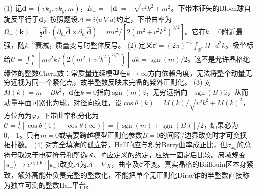 (1) 记\(\boldsymbol d=(vk_x,vk_y,m)\)，\(E_\pm=\pm|\boldsymbol d|=\pm\sqrt{v^2k^2+m^2}\)。下带本征矢的Bloch球自旋反平行于\(\boldsymbol d\)，按照题设\(\mathcal A=i\langle u|\nabla u\rangle\)约定，下带曲率为\(\Omega_-(\boldsymbol k)=\tfrac12\hat{\boldsymbol d}\cdot(\partial_{k_x}\hat{\boldsymbol d}\times\partial_{k_y}\hat{\boldsymbol d})=mv^2/[2(m^2+v^2k^2)^{3/2}]\)。它在\(k=0\)附近最强，随\(k^{-3}\)衰减，质量变号时整体反号。
(2) 定义\(\mathcal C=(2\pi)^{-1}\int_{\mathbb R^2}\Omega_-\,d^2k\)。极坐标给\(\mathcal C=\int_0^\infty [mv^2k/(2(m^2+v^2k^2)^{3/2})]\,dk=\operatorname{sgn}(m)/2\)。这不是允许晶格绝缘体的整数Chern数：常质量连续模型在\(k\to\infty\)方向依赖角度，无法将整个动量无穷远视为同一个紧化点，故半整数反映未完备的紫外正则化。
(3) 对\(M(k)=m-Bk^2\)，\(\hat{\boldsymbol d}\)在\(k=0\)指向\(\operatorname{sgn}(m)\hat z\)，无穷远指向\(-\operatorname{sgn}(B)\hat z\)，从而动量平面可紧化为球。对径向纹理，设\(\cos\theta(k)=M(k)/\sqrt{v^2k^2+M(k)^2}\)，方位角为\(\varphi\)，下带曲率积分化为\(\mathcal C=\frac12[\cos\theta(0)-\cos\theta(\infty)]=[\operatorname{sgn}(m)+\operatorname{sgn}(B)]/2\)，结果必为\(0,\pm1\)。只有\(m=0\)或需要跨越模型正则化参数\(B=0\)的间隙/边界改变时才可变换拓扑数。
(4) 对完全填满的孤立带，Hall响应与积分Berry曲率成正比，但\(\sigma_{xy}\)的总符号取决于电荷符号和所选\(\mathcal A\)、响应定义的约定，应统一固定后比较。局域规变\(|u_-\rangle\to e^{i\chi(\boldsymbol k)}|u_-\rangle\)改变\(\mathcal A\)为\(\mathcal A-\nabla\chi\)，曲率及\(\mathcal C\)不变。真实晶格的Brillouin区本身紧致，额外高能带负责完整的整数化，不能把单个无正则化Dirac锥的半整数直接称为独立可测的整数Hall平台。
